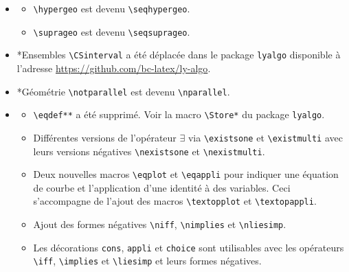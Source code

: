 \documentclass[12pt,a4paper]{book}
\makeatletter
\newcommand\env[1]{\texttt{#1}}
\newcommand\macro[1]{\env{\textbackslash{}#1}}
\theoremstyle{definition}
\newcommand\topic{\@ifstar{\@topic@star}{\@topic@no@star}}
\newcommand\@topic@no@star[1]{%
	\textbf{\textsc{#1}.}%
}
\newcommand\@topic@star[1]{%
	\textbf{\textsc{#1} :}%
}
\makeatother
\begin{document}
{{\begin{description}
    \begin{itemize}[itemsep=.5em]
        \item \topic{Analyse}
        \begin{itemize}[itemsep=.5em]
            \item \macro{hypergeo} est devenu \macro{seqhypergeo}.
    
            \item \macro{suprageo} est devenu \macro{seqsuprageo}.
        \end{itemize}
    
    
    
    
        \item \topic*{Ensembles}
              \macro{CSinterval} a été déplacée dans le package \verb+lyalgo+ disponible à l'adresse \url{https://github.com/bc-latex/ly-algo}.
    
    
    
    
        \item \topic*{Géométrie}
              \macro{notparallel} est devenu \macro{nparallel}.
    
    
    
    
        \item \topic{Logique}
        \begin{itemize}[itemsep=.5em]
            \item \macro{eqdef**} a été supprimé. Voir la macro \macro{Store*} du package \verb+lyalgo+.
    
            \item Différentes versions de l'opérateur $\exists$ via \macro{existsone} et \macro{existmulti} avec leurs versions négatives \macro{nexistsone} et \macro{nexistmulti}.
    
            \item Deux nouvelles macros \macro{eqplot} et \macro{eqappli} pour indiquer une équation de courbe et l'application d'une identité à des variables. Ceci s'accompagne de l'ajout des macros \macro{textopplot} et \macro{textopappli}.
    
            \item Ajout des formes négatives \macro{niff}, \macro{nimplies} et \macro{nliesimp}.
    
            \item Les décorations \verb+cons+, \verb+appli+ et \verb+choice+ sont utilisables avec les opérateurs \macro{iff}, \macro{implies} et \macro{liesimp} et leurs formes négatives.
    

\end{itemize}
\end{itemize}
\end{description}}}
\end{document}

